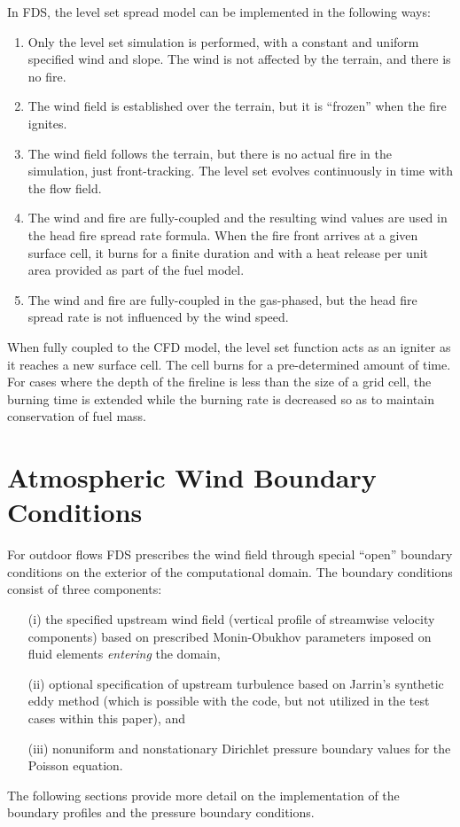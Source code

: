 \documentclass[journal,article,atmosphere,submit,moreauthors,pdftex]{Definitions/mdpi}
\begin{document}
In FDS, the level set spread model can be implemented in the following ways:
\begin{enumerate}
\item Only the level set simulation is performed, with a constant and uniform specified wind and slope. The wind is not affected by the terrain, and there is no fire.
\item The wind field is established over the terrain, but it is ``frozen'' when the fire ignites.
\item The wind field follows the terrain, but there is no actual fire in the simulation, just front-tracking.  The level set evolves continuously in time with the flow field.
\item The wind and fire are fully-coupled and the resulting wind values are used in the head fire spread rate formula. When the fire front arrives at a given surface cell, it burns for a finite duration and with a heat release per unit area provided as part of the fuel model.
\item The wind and fire are fully-coupled in the gas-phased, but the head fire spread rate is not influenced by the wind speed. 
\end{enumerate}
When fully coupled to the CFD model, the level set function acts as an igniter as it reaches a new surface cell. The cell burns for a pre-determined amount of time. For cases where the depth of the fireline is less than the size of a grid cell, the burning time is extended while the burning rate is decreased so as to maintain conservation of fuel mass.



\section{Atmospheric Wind Boundary Conditions}
\label{sec:wind}

For outdoor flows FDS prescribes the wind field through special ``open'' boundary conditions on the exterior of the computational domain.  The boundary conditions consist of three components:
\begin{enumerate}
\item[(i)] the specified upstream wind field (vertical profile of streamwise velocity components) based on prescribed Monin-Obukhov parameters imposed on fluid elements \emph{entering} the domain,
\item[(ii)] optional specification of upstream turbulence based on Jarrin's synthetic eddy method \cite{Jarrin:2008} (which is possible with the code, but not utilized in the test cases within this paper), and
\item[(iii)] nonuniform and nonstationary Dirichlet pressure boundary values for the Poisson equation.
\end{enumerate}
The following sections provide more detail on the implementation of the boundary profiles and the pressure boundary conditions.
\end{document}

